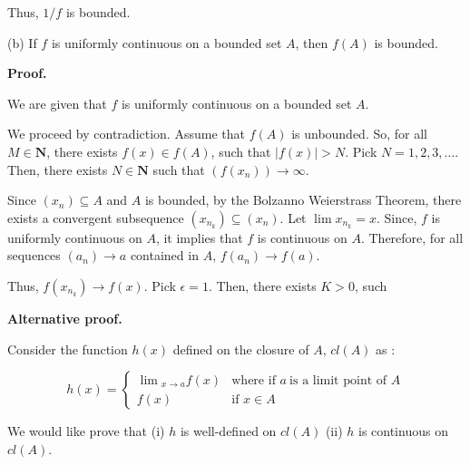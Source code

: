 \documentclass[10pt]{article}
\begin{document}
Thus, $\displaystyle 1/f$ is bounded.



(b) If $\displaystyle f$ is uniformly continuous on a bounded set $\displaystyle A$, then $\displaystyle f( A)$ is bounded.



\textbf{Proof.}



We are given that $\displaystyle f$ is uniformly continuous on a bounded set $\displaystyle A$. 



We proceed by contradiction. Assume that $\displaystyle f( A)$ is unbounded. So, for all $\displaystyle M\in \mathbf{N}$, there exists $\displaystyle f( x) \in f( A)$, such that $\displaystyle |f( x) | >N$. Pick $\displaystyle N=1,2,3,\dotsc $. Then, there exists $\displaystyle N\in \mathbf{N}$ such that $\displaystyle ( f( x_{n}))\rightarrow \infty $. 



Since $\displaystyle ( x_{n}) \subseteq A$ and $\displaystyle A$ is bounded, by the Bolzanno Weierstrass Theorem, there exists a convergent subsequence $\displaystyle ( x_{n_{k}}) \subseteq ( x_{n})$. Let $\displaystyle \lim x_{n_{k}} =x$. Since, $\displaystyle f$ is uniformly continuous on $\displaystyle A$, it implies that $\displaystyle f$ is continuous on $\displaystyle A$. Therefore, for all sequences $\displaystyle ( a_{n})\rightarrow a$ contained in $\displaystyle A$, $\displaystyle f( a_{n})\rightarrow f( a)$.



Thus, $\displaystyle f( x_{n_{k}})\rightarrow f( x)$. Pick $\displaystyle \epsilon =1$. Then, there exists $\displaystyle K >0$, such 



\textbf{Alternative proof.}



Consider the function $\displaystyle h( x)$ defined on the closure of $\displaystyle A$, $\displaystyle cl( A)$ as :


\begin{equation*}
h( x) =\begin{cases}
\lim{}_{x\rightarrow a} f( x) & \text{where }\text{if } a\ \text{is a limit point of } A\\
f( x) & \text{if } x\in A
\end{cases}
\end{equation*}


We would like prove that (i) $\displaystyle h$ is well-defined on $\displaystyle cl( A)$ (ii) $\displaystyle h$ is continuous on $\displaystyle cl( A)$.
\end{document}
